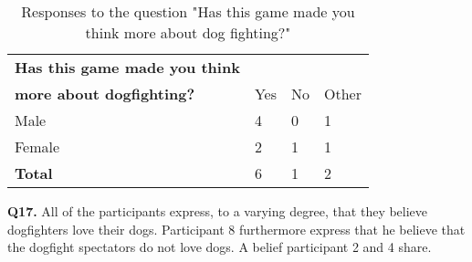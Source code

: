 \begin{table}[h]
\centering
\begin{tabular}{l l l l}
\hline
\textbf{Has this game made you think}\\
\textbf{more about dogfighting?} & Yes & No & Other \\
\hline
Male & 4 & 0 & 1 \\
Female & 2 & 1 & 1 \\
\textbf{Total} & 6 & 1 & 2 \\
\hline
\end{tabular}
\caption{\label{tab:thin}Responses to the question "Has this game made you think more about dog fighting?"}
\end{table}


\textbf{Q17.} All of the participants express, to a varying degree, that they believe dogfighters love their dogs. Participant 8 furthermore express that he believe that the dogfight spectators do not love dogs. A belief participant 2 and 4 share.